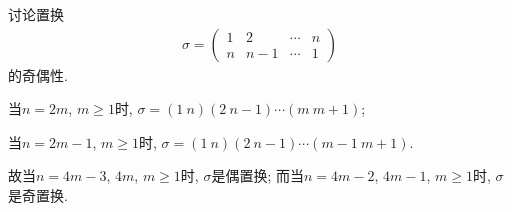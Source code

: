\documentclass[../../main.tex]{subfiles}%
\begin{document}
\begin{example}
讨论置换
\begin{align*}
\sigma = \begin{pmatrix}
1 & 2 & \cdots & n \\
n & n-1 & \cdots & 1
\end{pmatrix}
\end{align*}
的奇偶性.
\end{example}
\begin{solution}
当$n = 2m$, $m \geqslant 1$时, $\sigma = (1\ n)(2\ n-1)\cdots(m\ m+1)$;

当$n = 2m-1$, $m \geqslant 1$时, $\sigma = (1\ n)(2\ n-1)\cdots(m-1\ m+1)$.

故当$n = 4m-3$, $4m$, $m \geqslant 1$时, $\sigma$是偶置换; 而当$n = 4m-2$, $4m-1$, $m \geqslant 1$时, $\sigma$是奇置换.

\end{solution}
\end{document}
